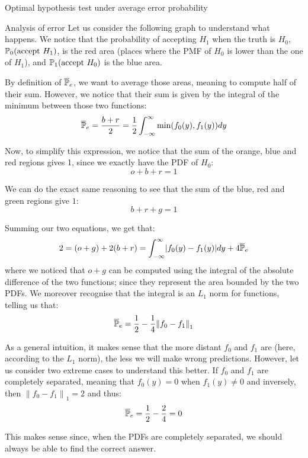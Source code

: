 \documentclass[a4paper]{article}
\begin{document}
\begin{parag}{Optimal hypothesis test under average error probability}
    \begin{subparag}{Analysis of error}
        Let us consider the following graph to understand what happens. We notice that the probability of accepting $H_1$ when the truth is $H_0$, $\prob_0\left(\text{accept $H_1$}\right)$, is the red area (places where the PMF of $H_0$ is lower than the one of $H_1$), and $\prob_1\left(\text{accept $H_0$}\right)$ is the blue area.


        By definition of $\overline{\mathbb{P}}_e$, we want to average those areas, meaning to compute half of their sum. However, we notice that their sum is given by the integral of the minimum between those two functions:
        \[\bar{\prob}_e = \frac{b + r}{2} = \frac{1}{2} \int_{-\infty}^{\infty} \min\left(f_0\left(y\right), f_1\left(y\right)\right)dy\]

        Now, to simplify this expression, we notice that the sum of the orange, blue and red regions gives 1, since we exactly have the PDF of $H_0$: 
        \[o + b + r = 1\]

        We can do the exact same reasoning to see that the sum of the blue, red and green regions give $1$: 
        \[b + r + g = 1\]
        
        Summing our two equations, we get that: 
        \[2 = \left(o + g\right) + 2\left(b + r\right) = \int_{-\infty}^{\infty} \left|f_0\left(y\right) - f_1\left(y\right)\right|dy + 4\bar{\prob}_e\]
        where we noticed that $o + g$ can be computed using the integral of the absolute difference of the two functions; since they represent the area bounded by the two PDFs. We moreover recognise that the integral is an $L_1$ norm for functions, telling us that: 
        \[\bar{\prob}_e = \frac{1}{2} - \frac{1}{4} \left\|f_0 - f_1\right\|_1\]
        
        As a general intuition, it makes sense that the more distant $f_0$ and $f_1$ are (here, according to the $L_1$ norm), the less we will make wrong predictions. However, let us consider two extreme cases to understand this better. If $f_0$ and $f_1$ are completely separated, meaning that $f_0\left(y\right) = 0$ when $f_1\left(y\right) \neq 0$ and inversely, then $\left\|f_0 - f_1\right\|_1 = 2$ and thus:
        \[\overline{\mathbb{P}}_e = \frac{1}{2} - \frac{2}{4} = 0\]

        This makes sense since, when the PDFs are completely separated, we should always be able to find the correct answer.


\end{subparag}
\end{parag}
\end{document}
